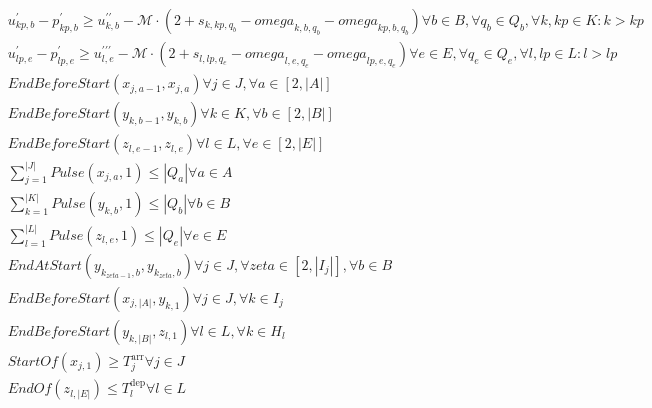 \begin{align}
  & u_{kp , b}^{'} - p_{kp , b}^{'} \geq u_{k , b}^{' '} - \mathcal{M} \cdot \left(2 + s_{k , kp , q_{b}} - \mathit{omega}_{k , b , q_{b}} - \mathit{omega}_{kp , b , q_{b}}\right) \forall b \in B , \forall q_{b} \in Q_{b} , \forall k , kp \in K : k > kp \tag{eq\_0035} \\
  & u_{lp , e}^{'} - p_{lp , e}^{'} \geq u_{l , e}^{' ' '} - \mathcal{M} \cdot \left(2 + s_{l , lp , q_{e}} - \mathit{omega}_{l , e , q_{e}} - \mathit{omega}_{lp , e , q_{e}}\right) \forall e \in E , \forall q_{e} \in Q_{e} , \forall l , lp \in L : l > lp \tag{eq\_0036} \\
  & \mathit{EndBeforeStart} \left(x_{j , a - 1} , x_{j , a}\right) \forall j \in J , \forall a \in \left[2 , \left|A\right|\right] \tag{eq\_0042} \\
  & \mathit{EndBeforeStart} \left(y_{k , b - 1} , y_{k , b}\right) \forall k \in K , \forall b \in \left[2 , \left|B\right|\right] \tag{eq\_0044} \\
  & \mathit{EndBeforeStart} \left(z_{l , e - 1} , z_{l , e}\right) \forall l \in L , \forall e \in \left[2 , \left|E\right|\right] \tag{eq\_0045} \\
  & \sum_{j = 1}^{\left|J\right|} \mathit{Pulse} \left(x_{j , a} , 1\right) \leq \left|Q_{a}\right| \forall a \in A \tag{eq\_0046} \\
  & \sum_{k = 1}^{\left|K\right|} \mathit{Pulse} \left(y_{k , b} , 1\right) \leq \left|Q_{b}\right| \forall b \in B \tag{eq\_0048} \\
  & \sum_{l = 1}^{\left|L\right|} \mathit{Pulse} \left(z_{l , e} , 1\right) \leq \left|Q_{e}\right| \forall e \in E \tag{eq\_0049} \\
  & \mathit{EndAtStart} \left(y_{k_{\mathit{zeta} - 1} , b} , y_{k_{\mathit{zeta}} , b}\right) \forall j \in J , \forall \mathit{zeta} \in \left[2 , \left|I_{j}\right|\right] , \forall b \in B \tag{eq\_0050} \\
  & \mathit{EndBeforeStart} \left(x_{j , \left|A\right|} , y_{k , 1}\right) \forall j \in J , \forall k \in I_{j} \tag{eq\_0051} \\
  & \mathit{EndBeforeStart} \left(y_{k , \left|B\right|} , z_{l , 1}\right) \forall l \in L , \forall k \in H_{l} \tag{eq\_0053} \\
  & \mathit{StartOf} \left(x_{j , 1}\right) \geq T_{j}^{\text{arr}} \forall j \in J \tag{eq\_0054} \\
  & \mathit{EndOf} \left(z_{l , \left|E\right|}\right) \leq T_{l}^{\text{dep}} \forall l \in L \tag{eq\_0056} \\

\end{align}

